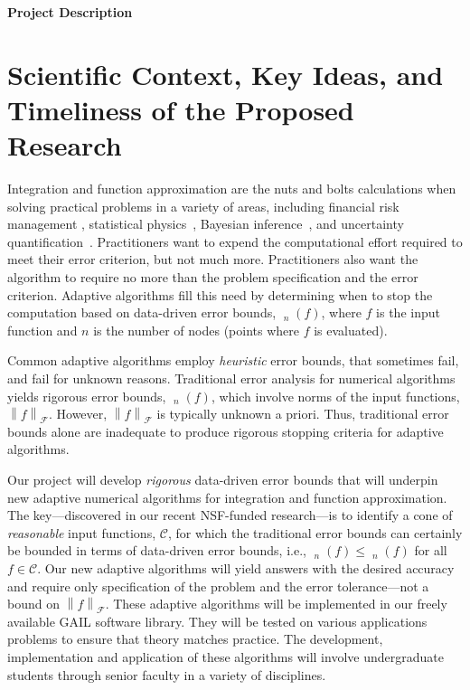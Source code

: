 \documentclass[11pt]{NSFamsart}
\DeclareMathOperator{\err}{err}
\DeclareMathOperator{\oerr}{\overline{\err}}
\DeclareMathOperator{\herr}{\widehat{\err}}
\newcommand{\cc}{\mathcal{C}}
\newcommand{\calf}{{\mathcal{F}}}
\newcommand{\norm}[2][{}]{\ensuremath{\left \lVert #2 \right \rVert}_{#1}}
\begin{document}

\centerline{\Large \textbf{Project Description}}
\vspace{-2ex}

\setcounter{tocdepth}{1}
\tableofcontents

\vspace{-6ex}

\section{Scientific Context, Key Ideas,  and Timeliness of the Proposed Research}
Integration and function approximation are the nuts and bolts calculations when 
solving practical problems in a variety of areas, including financial risk management \cite{Gla03}, 
statistical physics~\cite{LanBin14}, 
Bayesian inference~\cite{GelEtal13}, and uncertainty quantification~\cite{ForEtal09, Smi14a}.  
Practitioners 
want to expend the  
computational effort required to meet their error criterion, but not much more. 
Practitioners also want the algorithm to require no more than the problem specification and the 
error criterion.   Adaptive algorithms fill this need by determining when to stop the computation 
based on data-driven error bounds, $\herr_n(f)$, where $f$ is the input function and $n$ is the 
number of nodes (points where $f$ is evaluated).

Common adaptive algorithms employ \emph{heuristic} error bounds, that sometimes fail, and fail for 
unknown reasons. Traditional error 
analysis for numerical algorithms 
yields rigorous error bounds, $\oerr_n(f)$, which involve norms of the input functions, 
$\norm[\calf]{f}$.  However, $\norm[\calf]{f}$ is typically unknown a 
priori.  Thus, traditional  error 
bounds alone are inadequate  to produce rigorous stopping criteria for adaptive algorithms.

Our project will develop \emph{rigorous} data-driven error bounds that will underpin new adaptive 
numerical algorithms for integration and function approximation.  The 
key---discovered in our recent NSF-funded research---is to identify a cone of \emph{reasonable} 
input functions, 
$\cc$,  for which the traditional error bounds can certainly be bounded in terms of 
data-driven error bounds, i.e., $\oerr_n(f) \le \herr_n(f)$ for all $f \in \cc$.  
Our new adaptive algorithms will yield answers with the desired accuracy and require only 
specification of the problem and the error tolerance---not a bound on $\norm[\calf]{f}$. 
These adaptive algorithms will be implemented in our freely available GAIL software library.  They will 
be tested on various applications problems to ensure that theory matches practice.  The 
development, implementation and application of these algorithms will involve undergraduate 
students through senior faculty in a variety of disciplines.
\end{document}
